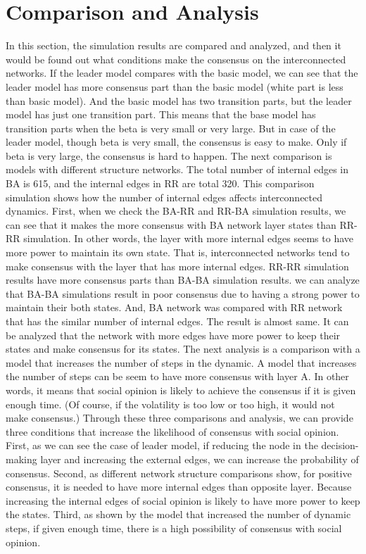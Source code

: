 \documentclass[english]{cccconf}
\begin{document}
\section{Comparison and Analysis}
In this section, the simulation results are compared and analyzed, and then it would be found out what conditions make the consensus on the interconnected networks.
If the leader model compares with the basic model, we can see that the leader model has more consensus part than the basic model (white part is less than basic model). And the basic model has two transition parts, but the leader model has just one transition part. This means that the base model has transition parts when the beta is very small or very large. But in case of the leader model, though beta is very small, the consensus is easy to make. Only if beta is very large, the consensus is hard to happen.   
The next comparison is models with different structure networks. The total number of internal edges in BA is 615, and the internal edges in RR are total 320. This comparison simulation shows how the number of internal edges affects interconnected dynamics. First, when we check the BA-RR and RR-BA simulation results, we can see that it makes the more consensus with BA network layer states than RR-RR simulation.  In other words, the layer with more internal edges seems to have more power to maintain its own state. That is, interconnected networks tend to make consensus with the layer that has more internal edges. RR-RR simulation results have more consensus parts than BA-BA simulation results. we can analyze that BA-BA simulations result in poor consensus due to having a strong power to maintain their both states. And, BA network was compared with RR network that has the similar number of internal edges. The result is almost same. It can be analyzed that the network with more edges have more power to keep their states and make consensus for its states. 
The next analysis is a comparison with a model that increases the number of steps in the dynamic. A model that increases the number of steps can be seem to have more consensus with layer A. In other words, it means that social opinion is likely to achieve the consensus if it is given enough time. (Of course, if the volatility is too low or too high, it would not make consensus.) 
Through these three comparisons and analysis, we can provide three conditions that increase the likelihood of consensus with social opinion. First, as we can see the case of leader model, if reducing the node in the decision-making layer and increasing the external edges, we can increase the probability of consensus. Second, as different network structure comparisons show, for positive consensus, it is needed to have more internal edges than opposite layer. Because increasing the internal edges of social opinion is likely to have more power to keep the states. Third, as shown by the model that increased the number of dynamic steps, if given enough time, there is a high possibility of consensus with social opinion.
\end{document}
